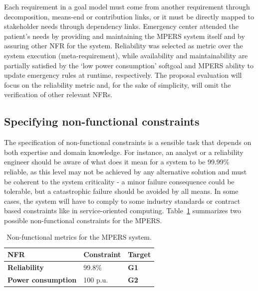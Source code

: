 

Each requirement in a goal model must come from another requirement through decomposition, means-end or contribution links, or it must be directly mapped to stakeholder needs through dependency links. Emergency center attended the patient's needs by providing and maintaining the MPERS system itself and by assuring other NFR for the system. Reliability was selected as metric over the system execution (meta-requirement), while availability and maintainability are partially satisfied by the `low power consumption' softgoal and MPERS ability to update emergency rules at runtime, respectively. The proposal evaluation will focus on the reliability metric and, for the sake of simplicity, will omit the verification of other relevant NFRs.

\subsection{Specifying non-functional constraints}

The specification of non-functional constraints is a sensible task that depends on both expertise and domain knowledge. For instance, an analyst or a reliability engineer should be aware of what does it mean for a system to be 99.99\% reliable, as this level may not be achieved by any alternative solution and must be coherent to the system criticality - a minor failure consequence could be tolerable, but a catastrophic failure should be avoided by all means. In some cases, the system will have to comply to some industry standards or contract based constraints like in service-oriented computing. Table~\ref{tab:MPERS_NFR} summarizes two possible non-functional constraints for the MPERS.
\medskip

\begin{table}[h]
{\renewcommand{\arraystretch}{1.5}
\begin{tabularx}{\textwidth}{@{}XXX@{}}
\toprule
\textbf{NFR}               & \textbf{Constraint} & \textbf{Target}        \\ \midrule
\textbf{Reliability}       & 99.8\%            & \textbf{G1} \\
\textbf{Power consumption} & 100 p.u.            & \textbf{G2}          \\ \bottomrule
\end{tabularx}
}
\caption{Non-functional metrics for the MPERS system.}
\label{tab:MPERS_NFR}
\end{table}

